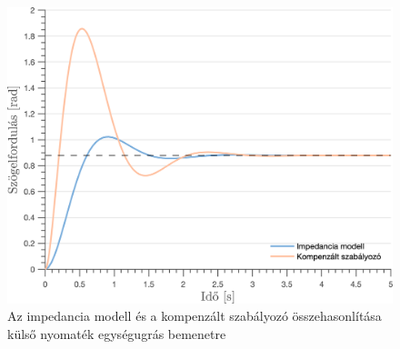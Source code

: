 \begin{figure}[ht]
    \begin{center}
    \includegraphics[width=\textwidth]{images/observer_controller_torque_resp_direct_comp.png}
    \caption{Az impedancia modell és a kompenzált szabályozó összehasonlítása külső nyomaték egységugrás bemenetre}\label{fig:observer_controller_torque_resp_direct}
    \end{center}
\end{figure}

